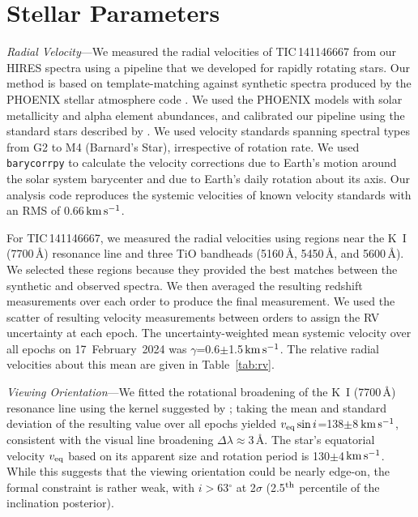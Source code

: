 \documentclass[11pt,twocolumn,tighten,linenumbers]{aastex7}
\newcommand{\kms}{\ensuremath{\rm km\,s^{-1}}}
\begin{document}
\appendix

\section{Stellar Parameters}
\label{sec:stparams}

{\it Radial Velocity}---We measured the radial velocities of
TIC\,141146667 from our HIRES spectra using a pipeline that we
developed for rapidly rotating stars.  Our method is based on
template-matching against synthetic spectra produced by the PHOENIX
stellar atmosphere code \citep{Husser2013}.  We used the PHOENIX models
with solar metallicity and alpha element abundances, and calibrated
our pipeline using the standard stars described by \citet{Chubak2012}.
We used velocity standards spanning spectral types from G2 to M4
(Barnard's Star), irrespective of rotation rate.  We used
\texttt{barycorrpy} \citep{Kanodia2018} to calculate the velocity
corrections due to Earth's motion around the solar system barycenter
and due to Earth's daily rotation about its axis.  Our analysis code
reproduces the systemic velocities of known velocity standards
\citep{Chubak2012} with an RMS of 0.66\,\kms.

For TIC\,141146667, we measured the radial velocities using regions
near the K~I (7700\,\AA) resonance line and three TiO bandheads
(5160\,\AA, 5450\,\AA, and 5600\,\AA).  We selected these regions
because they provided the best matches between the synthetic and
observed spectra.  We then averaged the resulting redshift
measurements over each order to produce the final measurement.  We
used the scatter of resulting velocity measurements between orders to
assign the RV uncertainty at each epoch.  The uncertainty-weighted
mean systemic velocity over all epochs on 17~February~2024 was
$\gamma$=0.6$\pm$1.5\,\kms.  The relative radial velocities about this
mean are given in Table~\ref{tab:rv}.

{\it Viewing Orientation}---We fitted the rotational broadening of the
K~I (7700\,\AA) resonance line using the kernel suggested by
\citet{Gray2008}; taking the mean and standard deviation of the
resulting value over all epochs yielded $v_{\rm eq} \sin
i$=138$\pm$8\,\kms, consistent with the visual line broadening $\Delta
\lambda$$\approx$3\,\AA.  The star's equatorial velocity $v_{\rm eq}$
based on its apparent size and rotation period is 130$\pm$4\,\kms.
While this suggests that the viewing orientation could be nearly
edge-on, the formal constraint is rather weak, with $i$$>$63$^\circ$
at 2$\sigma$ (2.5$^{\rm th}$ percentile of the inclination posterior).
\end{document}
